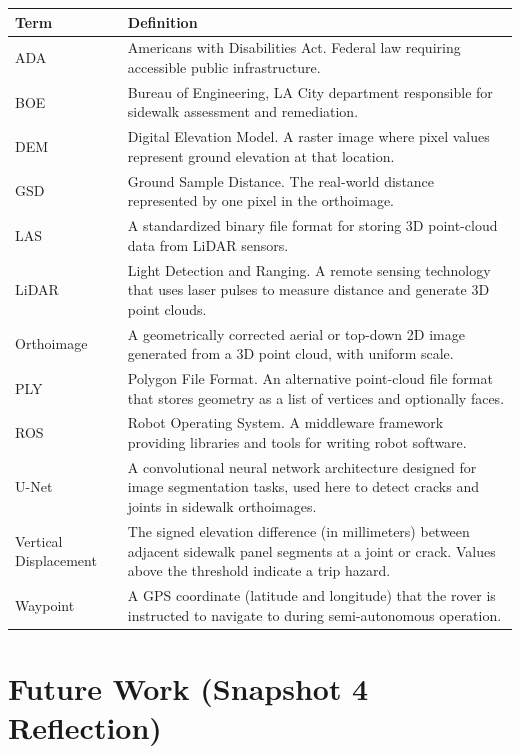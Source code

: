 \documentclass{article}
\begin{document}
\begin{longtable}{|p{1.5in}|p{5in}|}
\hline
\textbf{Term} & \textbf{Definition} \\
\hline
ADA & Americans with Disabilities Act. Federal law requiring accessible public
  infrastructure. \\
\hline
BOE & Bureau of Engineering, LA City department responsible for sidewalk
  assessment and remediation. \\
\hline
DEM & Digital Elevation Model. A raster image where pixel values represent
  ground elevation at that location. \\
\hline
GSD & Ground Sample Distance. The real-world distance represented by one pixel
  in the orthoimage. \\
\hline
LAS & A standardized binary file format for storing 3D point-cloud data from
  LiDAR sensors. \\
\hline
LiDAR & Light Detection and Ranging. A remote sensing technology that uses laser
  pulses to measure distance and generate 3D point clouds. \\
\hline
Orthoimage & A geometrically corrected aerial or top-down 2D image generated from a
  3D point cloud, with uniform scale. \\
\hline
PLY & Polygon File Format. An alternative point-cloud file format that stores
  geometry as a list of vertices and optionally faces. \\
\hline
ROS & Robot Operating System. A middleware framework providing libraries and tools
  for writing robot software. \\
\hline
U-Net & A convolutional neural network architecture designed for image segmentation
  tasks, used here to detect cracks and joints in sidewalk orthoimages. \\
\hline
Vertical Displacement & The signed elevation difference (in millimeters) between adjacent
  sidewalk panel segments at a joint or crack. Values above the threshold indicate
  a trip hazard. \\
\hline
Waypoint & A GPS coordinate (latitude and longitude) that the rover is instructed to
  navigate to during semi-autonomous operation. \\
\hline
\end{longtable}

\section{Future Work (Snapshot 4 Reflection)}
\end{document}
